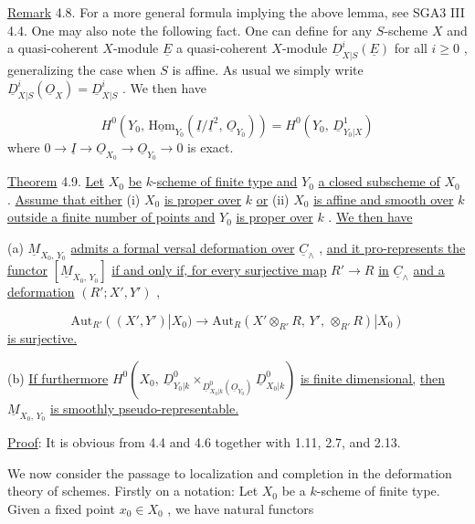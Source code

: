 \underline{Remark} 4.8.  For a more general formula implying the above lemma, see SGA3 III 4.4. One may also note the following fact. One can define for any $S$-scheme $X$ and a quasi-coherent $X$-module $\underline{E}$ a quasi-coherent $X$-module $\underline{D}^i_{X|S}(\underline{E})$ for all $i \geq 0$ , generalizing the case when $S$ is affine. As usual we simply write $\underline{D}^i_{X|S}(\underline{O}_X) = \underline{D}^i_{X|S}$ . We then have

\begin{equation*}
H^0(Y_0,\, \underline{\mathrm{Hom}}_{Y_0}(\underline{I}/\underline{I}^2,\, \underline{O}_{Y_0})) = H^0(Y_0,\, \underline{D}^1_{Y_0|X})
\end{equation*}
where $0 \to \underline{I} \to \underline{O}_{X_0} \to \underline{O}_{Y_0} \to 0$ is exact.

\underline{Theorem} 4.9.  \underline{Let} $X_0$ \underline{be} $k$-\underline{scheme of finite type and} $Y_0$ \underline{a closed subscheme of} $X_0$ . \underline{Assume that either} (i) $X_0$ \underline{is proper over} $k$ \underline{or} (ii) $X_0$ \underline{is affine and smooth over} $k$ \underline{outside a finite number of points and} $Y_0$ \underline{is proper over} $k$ . \underline{We then have}

(a) $\underline{M}_{X_0,\,Y_0}$ \underline{admits a formal versal deformation over} $\underline{C}_\wedge$ , \underline{and it pro-represents the functor} $[\underline{M}_{X_0,\,Y_0}]$ \underline{if and only if, for every surjective map} $R' \to R$ \underline{in} $\underline{C}_\wedge$ \underline{and a deformation} $(R'; X', Y')$ ,

\begin{equation*}
\mathrm{Aut}_{R'}((X', Y')|X_0) \to \mathrm{Aut}_R(X' \otimes_{R'} R,\, Y',\, \otimes_{R'} R)|X_0)
\end{equation*}
\underline{is surjective.}

(b) \underline{If furthermore} $H^0(X_0,\, \underline{D}^0_{Y_0|k} \times_{\underline{D}^0_{X_0|k}(\underline{O}_{Y_0})} \underline{D}^0_{X_0|k})$ \underline{is finite dimensional,} \underline{then} $\underline{M}_{X_0,\,Y_0}$ \underline{is smoothly pseudo-representable.}

\underline{Proof}: It is obvious from 4.4 and 4.6 together with 1.11, 2.7, and 2.13.

We now consider the passage to localization and completion in the deformation theory     of schemes. Firstly on a notation: Let $X_0$ be a $k$-scheme of finite type. Given a fixed point $x_0 \in X_0$ , we have natural functors

